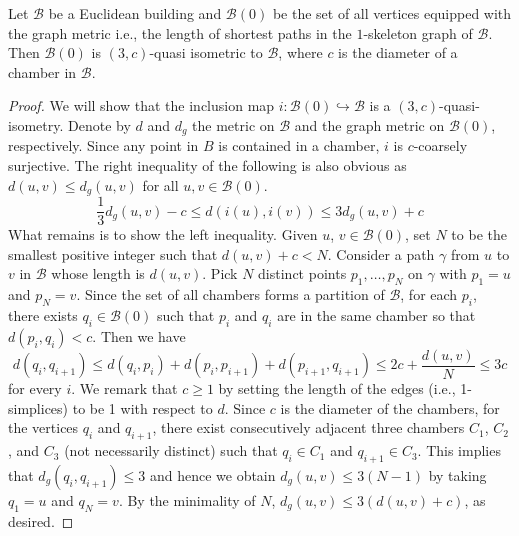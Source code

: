 \documentclass[10pt,a4paper]{amsart}
\newcommand{\cal}{\mathcal}
\newcommand{\ga}{\gamma}
\begin{document}
\begin{lemma}\label{skeleton}
    Let $\cal{B}$ be a Euclidean building and $\cal{B}(0)$ be the set of all vertices equipped with the graph metric i.e., the length of shortest paths in the $1$-skeleton graph of $\cal{B}$.
    Then $\cal{B}(0)$ is $(3,c)$-quasi isometric to $\cal{B}$, where $c$ is the diameter of a chamber in $\cal{B}$.
\end{lemma}

\begin{proof}
    We will show that the inclusion map $i: \cal{B}(0) \hookrightarrow \cal{B}$ is a $(3,c)$-quasi-isometry.
    Denote by $d$ and $d_{g}$ the metric on $\cal{B}$ and the graph metric on $\cal{B}(0)$, respectively.
    Since any point in $B$ is contained in a chamber, $i$ is $c$-coarsely surjective.
    The right inequality of the following is also obvious as $d(u,v) \leq d_g(u,v)$ for all $u,v \in \cal{B}(0)$.
    $$
    \frac{1}{3}d_g(u,v)-c \leq d(i(u),i(v)) \leq 3d_g(u,v)+c 
    $$
    What remains is to show the left inequality. Given $u$, $v \in \cal{B}(0)$, set $N$ to be the smallest positive integer such that $d(u,v)+c < N$.
    Consider a path $\ga$ from $u$ to $v$ in $\cal{B}$ whose length is $d(u,v)$.  Pick $N$ distinct points $p_1, \dots ,p_N $ on $\ga$ with $p_1=u$ and $p_{N}=v$. Since the set of all chambers forms a partition of $\cal{B}$, for each $p_i$, there exists $q_i \in \cal{B}(0)$ such that $p_i$ and $q_i$ are in the same chamber so that $d(p_i,q_i)<c$.
    Then we have 
    $$
    d(q_i,q_{i+1}) \leq d(q_i,p_i)+d(p_i,p_{i+1})+d(p_{i+1},q_{i+1})
    \leq 2c + \frac{d(u,v)}{N} \leq 3c 
    $$
    for every $i$. We remark that $c \geq 1$ by setting the length of the edges (i.e., 1-simplices) to be 1 with respect to $d$.
    Since $c$ is the diameter of the chambers,
    for the vertices $q_i$ and $q_{i+1}$, there exist consecutively adjacent three chambers $C_1$, $C_2$, and $C_3$ (not necessarily distinct) such that $q_i \in C_1$ and $q_{i+1} \in C_3$.
    This implies that $d_g(q_i,q_{i+1}) \leq 3 $ 
    and hence we obtain $d_g(u,v)\leq 3(N-1)$ by taking $q_1=u$ and $q_{N}=v$.
    By the minimality of $N$, $d_g(u,v) \leq 3(d(u,v)+c)$, as desired.  
\end{proof}
\end{document}
